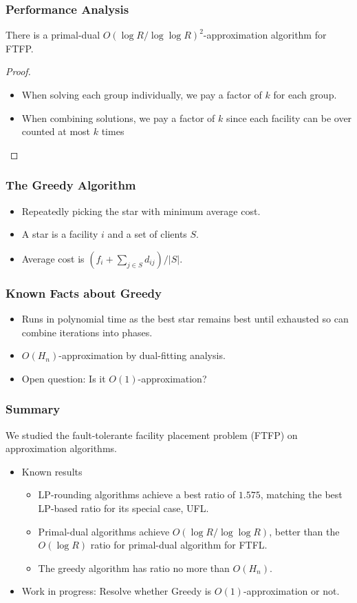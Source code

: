 \documentclass[hyperref, xcolor=dvipsnames]{beamer}
\begin{document}
\begin{frame}
  \frametitle{Performance Analysis}
  \begin{theorem}
    There is a primal-dual $O(\log R /\log\log R)^2$-approximation
    algorithm for FTFP.
  \end{theorem}
  \begin{proof}
    \begin{itemize}
    \item When solving each group individually, we pay a factor of $k$
      for each group.
    \item When combining solutions, we pay a factor of $k$ since each
      facility can be over counted at most $k$ times
    \end{itemize}
  \end{proof}
\end{frame}

\begin{frame}
  \frametitle{The Greedy Algorithm}
  \begin{itemize}
  \item Repeatedly picking the star with minimum average cost.
  \item A star is a facility $i$ and a set of clients $S$.
  \item Average cost is $ (f_i + \sum_{j\in S} d_{ij}) / |S|$.
  \end{itemize}
\end{frame}

\begin{frame}
  \frametitle{Known Facts about Greedy}
  \begin{itemize}
  \item Runs in polynomial time as the best star remains best until
    exhausted so can combine iterations into phases.
  \item $O(H_n)$-approximation by dual-fitting analysis.
  \item Open question: Is it $O(1)$-approximation?
  \end{itemize}
\end{frame}

\begin{frame}
  \frametitle{Summary} We studied the fault-tolerante facility
  placement problem (FTFP) on approximation algorithms.

  \begin{itemize}
  \item Known results
    \begin{itemize}
    \item LP-rounding algorithms achieve a best ratio of $1.575$,
      matching the best LP-based ratio for its special case, UFL.
    \item Primal-dual algorithms achieve $O(\log R/\log\log R)$,
      better than the $O(\log R)$ ratio for primal-dual algorithm for
      FTFL.
    \item The greedy algorithm has ratio no more than $O(H_n)$.
  \end{itemize}
  \item Work in progress:
    Resolve whether Greedy is $O(1)$-approximation or not.
  \end{itemize}
\end{frame}
\end{document}
